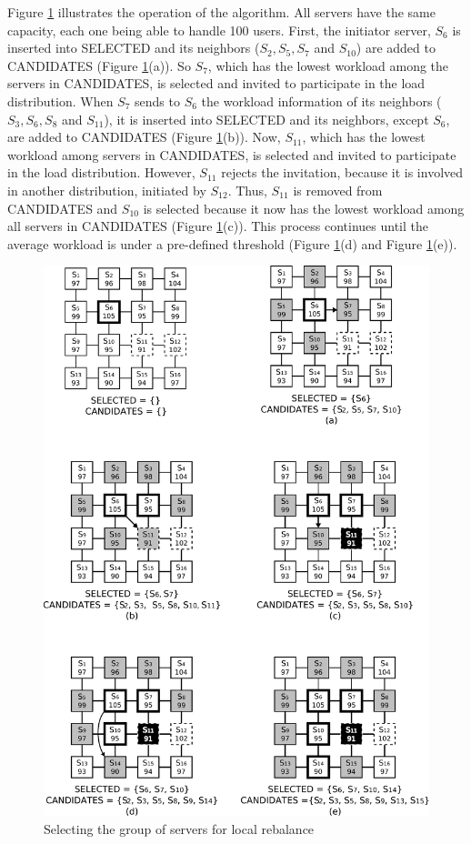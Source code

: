 Figure \ref{fig:lee2} illustrates the operation of the algorithm. All servers have the same capacity, each one being able to handle 100 users. First, the initiator server, $S_6$ is inserted into SELECTED and its neighbors ($S_2, S_5, S_7$ and $S_{10}$) are added to CANDIDATES (Figure \ref{fig:lee2}(a)). So $S_7$, which has the lowest workload among the servers in CANDIDATES, is selected and invited to participate in the load distribution. When $S_7$ sends to $S_6$ the workload information of its neighbors ($S_3, S_6, S_8$ and $S_{11}$), it is inserted into SELECTED and its neighbors, except $S_6$, are added to CANDIDATES (Figure \ref{fig:lee2}(b)). Now, $S_{11}$, which has the lowest workload among servers in CANDIDATES, is selected and invited to participate in the load distribution. However, $S_{11}$ rejects the invitation, because it is involved in another distribution, initiated by $S_{12}$. Thus, $S_{11}$ is removed from CANDIDATES and $S_{10}$ is selected because it now has the lowest workload among all servers in CANDIDATES (Figure \ref{fig:lee2}(c)). This process continues until the average workload is under a pre-defined threshold (Figure \ref{fig:lee2}(d) and Figure \ref{fig:lee2}(e)).

\begin{figure}
 \centering
 \includegraphics[width=1.04\textwidth]{images/localselection}
 \caption{Selecting the group of servers for local rebalance}
 \label{fig:lee2}
\end{figure}

